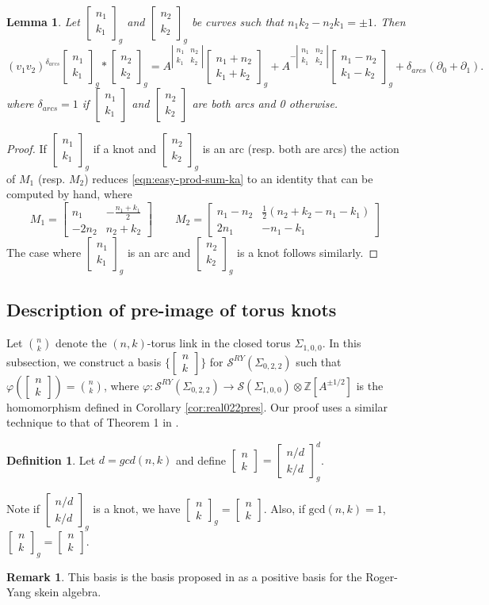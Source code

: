 \documentclass{article}
\newcommand{\del}{\partial}
\newcommand{\Z}{\mathbb{Z}}
\renewcommand{\phi}{\varphi}
\renewcommand{\gcd}{\text{gcd}}
\newcommand{\lildet}[4]{\left|\begin{smallmatrix}#1&#2\\#3&#4\end{smallmatrix}\right|}
\renewcommand{\S}{\mathcal{S}}
\newcommand{\SRY}{\mathcal{S}^{RY}}
\newcommand{\san}{\Sigma_{0,2,2}}
\newcommand{\sto}{\Sigma_{1,0,0}}
\newcommand{\twos}[2]{\left[\begin{smallmatrix}#1\\#2\end{smallmatrix}\right]}
\newcommand{\two}[2]{\begin{bmatrix}#1\\#2\end{bmatrix}}
\newtheorem{lemma}[theorem]{Lemma}
\theoremstyle{definition}
\newtheorem{remark}[theorem]{Remark}
\newtheorem{definition}[theorem]{Definition}
\renewcommand{\san}{\Sigma_{0, 2, 2}}
\renewcommand{\SRY}{\ensuremath{ \mathcal S^{RY}}}
\begin{document}
\begin{lemma}\label{lem:easy-prod-sum}
Let $\twos{n_1}{k_1}_g$ and $\twos{n_2}{k_2}_g$ be curves such that $n_1k_2-n_2k_1=\pm 1$. Then
\begin{equation}\label{eqn:easy-prod-sum-ka}
    (v_1v_2)^{\delta_{arcs}}\two{n_1}{k_1}_g*\two{n_2}{k_2}_g=A^{\lildet{n_1}{n_2}{k_1}{k_2}}\two{n_1+n_2}{k_1+k_2}_g+A^{-\lildet{n_1}{n_2}{k_1}{k_2}}\two{n_1-n_2}{k_1-k_2}_g+\delta_{arcs}(\del_0+\del_1).
\end{equation}
where $\delta_{arcs}=1$ if $\twos{n_1}{k_1}$ and $\twos{n_2}{k_2}$ are both arcs and 0 otherwise.
\end{lemma}
\begin{proof}
If $\twos{n_1}{k_1}_g$ if a knot and $\twos{n_2}{k_2}_g$ is an arc (resp. both are arcs) the action of $M_1$ (resp. $M_2$) reduces \eqref{eqn:easy-prod-sum-ka} to an identity that can be computed by hand, where
\[
M_1=\begin{bmatrix}
        n_1&-\frac{n_1+k_1}{2}\\
        -2n_2&n_2+k_2
    \end{bmatrix}
    \qquad
    M_2=\begin{bmatrix}
        n_1-n_2& \frac{1}{2}(n_2+k_2-n_1-k_1)\\
        2n_1&-n_1-k_1
    \end{bmatrix}
\]
The case where $\twos{n_1}{k_1}_g$ is an arc and $\twos{n_2}{k_2}_g$ is a knot follows similarly.
\end{proof}




\subsection{Description of pre-image of torus knots} \label{sec:torusknots}
Let ${n\choose k}$ denote the $(n,k)$-torus link in the closed torus $\sto$. 
In this subsection, we construct a basis $\{\twos{n}{k}\}$ for $\SRY(\san)$ such that $\phi(\twos{n}{k})={n\choose k}$, where $\phi:\SRY(\san)\to \S(\sto)\otimes \Z[A^{\pm 1/2}]$ is the homomorphism defined in Corollary \ref{cor:real022pres}. Our proof uses a similar technique to that of Theorem 1 in \cite{FrohmanGelca}. 

\begin{definition}
	Let $d=gcd(n,k)$ and define $\two{n}{k}=\two{n/d}{k/d}_g^d$.
\end{definition}
 Note if $\twos{n/d}{k/d}_g$ is a knot, we have $\twos{n}{k}_g=\twos{n}{k}$. Also, if $\gcd(n,k)=1$, $\twos{n}{k}_g=\twos{n}{k}$.
\begin{remark}
	This basis is the basis proposed in \cite{KaruoPositive} as a positive basis for the Roger-Yang skein algebra.
\end{remark}
\end{document}
